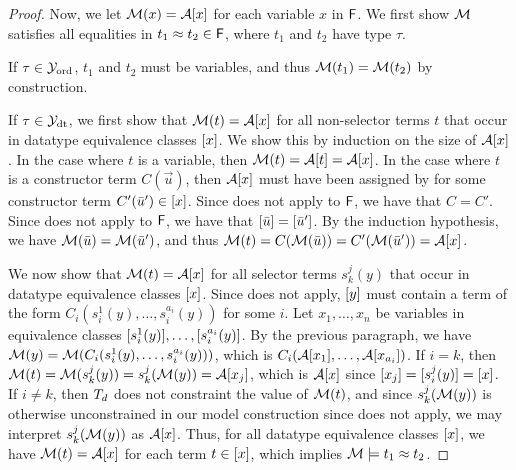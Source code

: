 \begin{proof}
\begin{comment}
For each equivalence class $e : \tau$, where $\tau \in \Nondata$ containing constant $c$,
$\Val(x) = c$ for each $x \in e$.
For each $e : \tau$, where $\tau \in \Data$ containing the constructor term $C( \vec u )$ where the equivalence classes $\ec{\vec u}$ contains the variables $\vec y$,
$\Val(x) = C( \Val( \vec y ) )$ for each $x \in e$.
Since \rn{Cyclic} does not apply, this definition is well-defined. 
For each $e : \tau$, where $\tau \in \Codata$, 
$\Val( x ) = \interp{ \tpath{\Fc}{e} }$ for each $x \in e$.
Since neither \rn{Cong} or \rn{Bisimilar} applies to $\Fc$, we have that for all variables $x$ and $y$:
\begin{eqnarray} \label{eqn:m-bij-dt}
\Val(x) = \Val(y) \text{ if and only if } \ec{x} = \ec{y}
\end{eqnarray}
\end{comment}

Now, we let $\mathcal{M}( x ) = \mathcal{A} [ x ]$ for each variable $x$ in $\mathsf{F}$.
We first show $\mathcal{M}$ satisfies all equalities in $t_1 \approx t_2 \in \mathsf{F}$, where $t_1$ and $t_2$ have type $\tau$.

If $\tau \in \mathcal{Y}_{\mathrm{ord}}$, $t_1$ and $t_2$ must be variables, and thus $\mathcal{M}( t_1 ) = \mathcal{M}( t_2 )$ by construction.

If $\tau \in \mathcal{Y}_{\mathrm{dt}}$,
we first show that $\mathcal{M}( t ) = \mathcal{A} [ x ]$ for all non-selector terms $t$ that occur in datatype equivalence classes $[ x ]$.
We show this by induction on the size of $\mathcal{A} [ x ]$.
In the case where $t$ is a variable, then $\mathcal{M}( t ) = \mathcal{A} [  t  ] = \mathcal{A} [  x  ]$.
In the case where $t$ is a constructor term $C( \vec u )$, 
then $\mathcal{A} [ x ]$ must have been assigned by  for some constructor term $C'( \bar u' ) \in [ x ]$.
Since  does not apply to $\mathsf{F}$, we have that $C = C'$.
Since  does not apply to $\mathsf{F}$, we have that $[ \bar u ] = [ \bar u' ]$.
By the induction hypothesis, we have $\mathcal{M}( \bar u ) = \mathcal{M}( \bar u' )$, and thus $\mathcal{M}( t ) = C( \mathcal{M}( \bar u ) ) = C'( \mathcal{M}( \bar u ' ) ) = \mathcal{A} [  x  ]$.

We now show that $\mathcal{M}( t ) = \mathcal{A} [ x ]$ for all selector terms $s^j_k( y )$ that occur in datatype equivalence classes $[ x ]$.
Since  does not apply, 
$[ y ]$ must contain a term of the form $C_i( s^1_i( y ), \ldots, s^{a_i}_i( y ) )$ for some $i$.
Let $x_1, \ldots, x_n$ be variables in equivalence classes $[ s^1_i( y ) ], \ldots, [ s^{a_i}_i( y ) ]$.
By the previous paragraph, we have $\mathcal{M}( y ) = \mathcal{M}( C_i( s^1_i( y ), \ldots, s^{a_i}_i( y ) ) )$,
which is $C_i( \mathcal{A} [  x_1  ], \ldots, \mathcal{A} [  x_{a_i}  ] )$.
If $i = k$, then $\mathcal{M}( t ) = \mathcal{M}( s^j_k( y ) ) = s^j_k( \mathcal{M}( y ) ) = \mathcal{A} [ x_j ]$, which is $\mathcal{A} [  x  ]$ since $[ x_j ] = [ s^j_i( y ) ] = [ x ]$.
If $i \neq k$, then $T_{d}$ does not constraint the value of $\mathcal{M}( t )$,
and since $s^j_k( \mathcal{M}( y ) )$ is otherwise unconstrained in our model construction since  does not apply, 
we may interpret $s^j_k( \mathcal{M}( y ) )$ as $\mathcal{A} [  x  ]$. 
Thus, for all datatype equivalence classes $[ x ]$, we have $\mathcal{M}( t ) = \mathcal{A} [ x ]$ for each term $t \in [ x ]$, which implies $\mathcal{M} \models t_1 \approx t_2$.


\end{proof}
